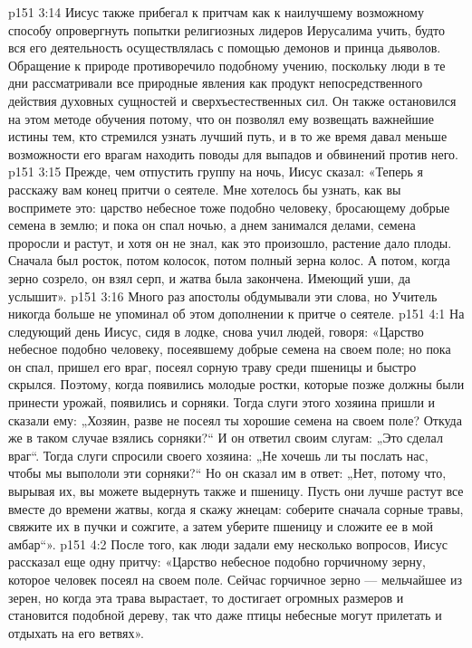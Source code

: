 \vs p151 3:14 Иисус также прибегал к притчам как к наилучшему возможному способу опровергнуть попытки религиозных лидеров Иерусалима учить, будто вся его деятельность осуществлялась с помощью демонов и принца дьяволов. Обращение к природе противоречило подобному учению, поскольку люди в те дни рассматривали все природные явления как продукт непосредственного действия духовных сущностей и сверхъестественных сил. Он также остановился на этом методе обучения потому, что он позволял ему возвещать важнейшие истины тем, кто стремился узнать лучший путь, и в то же время давал меньше возможности его врагам находить поводы для выпадов и обвинений против него.
\vs p151 3:15 Прежде, чем отпустить группу на ночь, Иисус сказал: «Теперь я расскажу вам конец притчи о сеятеле. Мне хотелось бы узнать, как вы воспримете это: царство небесное тоже подобно человеку, бросающему добрые семена в землю; и пока он спал ночью, а днем занимался делами, семена проросли и растут, и хотя он не знал, как это произошло, растение дало плоды. Сначала был росток, потом колосок, потом полный зерна колос. А потом, когда зерно созрело, он взял серп, и жатва была закончена. Имеющий уши, да услышит».
\vs p151 3:16 Много раз апостолы обдумывали эти слова, но Учитель никогда больше не упоминал об этом дополнении к притче о сеятеле.
\vs p151 4:1 На следующий день Иисус, сидя в лодке, снова учил людей, говоря: «Царство небесное подобно человеку, посеявшему добрые семена на своем поле; но пока он спал, пришел его враг, посеял сорную траву среди пшеницы и быстро скрылся. Поэтому, когда появились молодые ростки, которые позже должны были принести урожай, появились и сорняки. Тогда слуги этого хозяина пришли и сказали ему: „Хозяин, разве не посеял ты хорошие семена на своем поле? Откуда же в таком случае взялись сорняки?“ И он ответил своим слугам: „Это сделал враг“. Тогда слуги спросили своего хозяина: „Не хочешь ли ты послать нас, чтобы мы выпололи эти сорняки?“ Но он сказал им в ответ: „Нет, потому что, вырывая их, вы можете выдернуть также и пшеницу. Пусть они лучше растут все вместе до времени жатвы, когда я скажу жнецам: соберите сначала сорные травы, свяжите их в пучки и сожгите, а затем уберите пшеницу и сложите ее в мой амбар“».
\vs p151 4:2 \pc После того, как люди задали ему несколько вопросов, Иисус рассказал еще одну притчу: «Царство небесное подобно горчичному зерну, которое человек посеял на своем поле. Сейчас горчичное зерно --- мельчайшее из зерен, но когда эта трава вырастает, то достигает огромных размеров и становится подобной дереву, так что даже птицы небесные могут прилетать и отдыхать на его ветвях».
